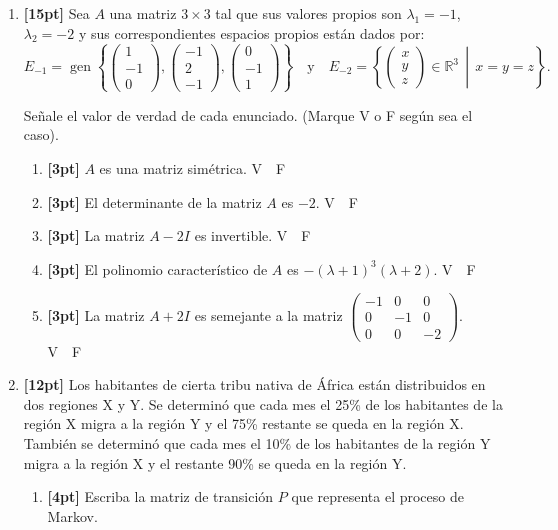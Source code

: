 \documentclass[11pt]{article}
\begin{document}
\begin{enumerate}
\item \textbf{[15pt]} Sea $A$ una matriz $3\times 3$ tal que sus valores propios son $\lambda_1=-1$, $\lambda_2=-2$ y sus correspondientes espacios propios est\'an dados por:
\[
E_{-1} = \operatorname{gen}\left\{\begin{pmatrix}1\\-1\\0\end{pmatrix}, \begin{pmatrix}-1\\2\\-1\end{pmatrix}, \begin{pmatrix}0\\-1\\1\end{pmatrix}\right\} \quad \text{y} \quad E_{-2} = \left\{\begin{pmatrix}x\\y\\z\end{pmatrix}\in\mathbb{R}^3 \,\middle|\, x=y=z\right\}.
\]

Se\~nale el valor de verdad de cada enunciado. (Marque V o F seg\'un sea el caso).
\begin{enumerate}[label=(\alph*)]
\item \textbf{[3pt]} $A$ es una matriz sim\'etrica. \hfill V\ \dotfill\ F\ \dotfill
\item \textbf{[3pt]} El determinante de la matriz $A$ es $-2$. \hfill V\ \dotfill\ F\ \dotfill
\item \textbf{[3pt]} La matriz $A-2I$ es invertible. \hfill V\ \dotfill\ F\ \dotfill
\item \textbf{[3pt]} El polinomio caracter\'istico de $A$ es $-(\lambda+1)^3(\lambda+2)$. \hfill V\ \dotfill\ F\ \dotfill
\item \textbf{[3pt]} La matriz $A+2I$ es semejante a la matriz $\begin{pmatrix}-1 & 0 & 0\\ 0 & -1 & 0\\ 0 & 0 & -2\end{pmatrix}$. \hfill V\ \dotfill\ F\ \dotfill
\end{enumerate}

\item \textbf{[12pt]} Los habitantes de cierta tribu nativa de \'Africa est\'an distribuidos en dos regiones X y Y. Se determin\'o que cada mes el 25\% de los habitantes de la regi\'on X migra a la regi\'on Y y el 75\% restante se queda en la regi\'on X. Tambi\'en se determin\'o que cada mes el 10\% de los habitantes de la regi\'on Y migra a la regi\'on X y el restante 90\% se queda en la regi\'on Y.
\begin{enumerate}[label=(\alph*)]
\item \textbf{[4pt]} Escriba la matriz de transici\'on $P$ que representa el proceso de Markov.


\end{enumerate}
\end{enumerate}
\end{document}
